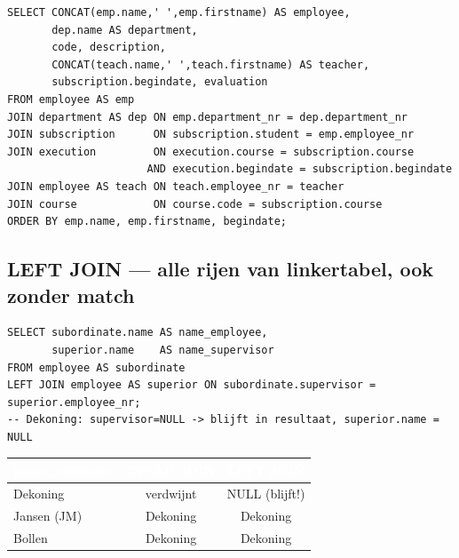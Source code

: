 \documentclass[10pt,a4paper]{article}
\newcommand{\TBLH}[1]{\textbf{\textcolor{white}{#1}}}
\begin{document}
\begin{tcolorbox}[sqlbox,title=Grote join over 5 tabellen (uit oplossingen)]
\begin{lstlisting}
SELECT CONCAT(emp.name,' ',emp.firstname) AS employee,
       dep.name AS department,
       code, description,
       CONCAT(teach.name,' ',teach.firstname) AS teacher,
       subscription.begindate, evaluation
FROM employee AS emp
JOIN department AS dep ON emp.department_nr = dep.department_nr
JOIN subscription      ON subscription.student = emp.employee_nr
JOIN execution         ON execution.course = subscription.course
                      AND execution.begindate = subscription.begindate
JOIN employee AS teach ON teach.employee_nr = teacher
JOIN course            ON course.code = subscription.course
ORDER BY emp.name, emp.firstname, begindate;
\end{lstlisting}
\end{tcolorbox}

\subsection{LEFT JOIN --- alle rijen van linkertabel, ook zonder match}

\begin{tcolorbox}[sqlbox,title=CEO bewaren die geen supervisor heeft]
\begin{lstlisting}
SELECT subordinate.name AS name_employee,
       superior.name    AS name_supervisor
FROM employee AS subordinate
LEFT JOIN employee AS superior ON subordinate.supervisor = superior.employee_nr;
-- Dekoning: supervisor=NULL -> blijft in resultaat, superior.name = NULL
\end{lstlisting}
\end{tcolorbox}

\begin{tcolorbox}[resbox,title=Verschil INNER vs LEFT JOIN voor Dekoning]
{\scriptsize\begin{tabular}{|l|c|c|}
\hline
\rowcolor{tblhead}\TBLH{name\_employee} & \TBLH{INNER JOIN} & \TBLH{LEFT JOIN} \\ \hline
Dekoning    & verdwijnt & NULL (blijft!) \\ \hline
\rowcolor{rowalt}
Jansen (JM) & Dekoning  & Dekoning \\ \hline
Bollen      & Dekoning  & Dekoning \\ \hline
\end{tabular}}
\end{tcolorbox}
\end{document}
